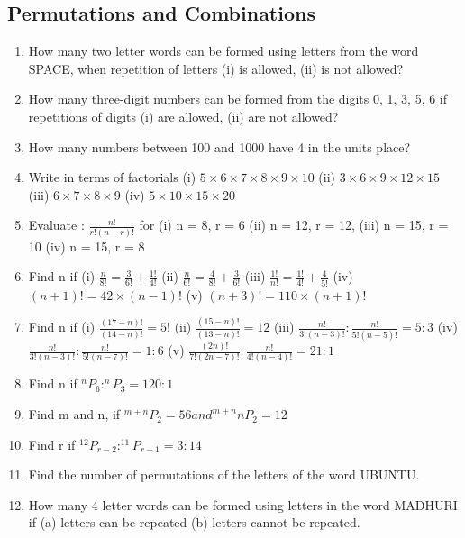\documentclass[14pt]{article}
\begin{document}
\begin{multicols}{2}
\section{Permutations and Combinations}
\noindent
\begin{enumerate}[resume]
  
\item How many two letter words can be formed
using letters from the word SPACE, when
repetition of letters (i) is allowed, (ii) is not
allowed?
\item How many three-digit numbers can be
formed from the digits 0, 1, 3, 5, 6 if
repetitions of digits (i) are allowed, (ii) are
not allowed?
\item How many numbers between 100 and 1000
have 4 in the units place?
		 
\item Write in terms of factorials
(i)	$5 \times 6 \times 7 \times 8 \times 9 \times 10	$
(ii)	$3 \times 6 \times 9 \times 12 \times 15$
(iii)	$6 \times 7 \times 8 \times 9$
(iv)  $5 \times 10 \times 15 \times 20$

\item 
Evaluate : $\frac{n!}{r!(n-r)!}$ for  (i)	 n = 8, r = 6	 (ii)	 n = 12, r = 12,
	 (iii)	 n = 15, r = 10	 (iv)	 n = 15, r = 8
	 
\item Find n if
(i) $\frac{n}{8!}= \frac{3}{6!}+\frac{1!}{4!}$
(ii) $\frac{n}{6!}= \frac{4}{8!}+\frac{3}{6!}$
(iii) $\frac{1!}{n!}= \frac{1!}{4!}+\frac{4}{5!}$
(iv) $(n+1)!=42 \times (n-1)!$
(v) $(n+3)!=110 \times (n+1)!$

\item Find n if
(i) $\frac{(17-n)!}{(14-n)!}= 5!$
(ii) $\frac{(15-n)!}{(13-n)!}= 12$
(iii) $\frac{n!}{3!(n-3)!}:\frac{n!}{5!(n-5)!}=5:3$
(iv) $\frac{n!}{3!(n-3)!}:\frac{n!}{5!(n-7)!}=1:6$
(v) $\frac{(2n)!}{7!(2n-7)!}:\frac{n!}{4!(n-4)!}=21:1$ 

\item Find n if $^nP_6 : ^nP_3=120:1$

\item Find m and n, if $^{m+n}P_2 = 56 and ^{m+n}nP_2=12$

\item Find r if $^12P_{r-2} : ^11P_{r-1}=3:14$

\item Find the number of permutations of the
letters of the word UBUNTU.

\item How many 4 letter words can be formed
using letters in the word MADHURI if
(a) letters can be repeated (b) letters cannot
be repeated.




\end{enumerate}
\end{multicols}
\end{document}
